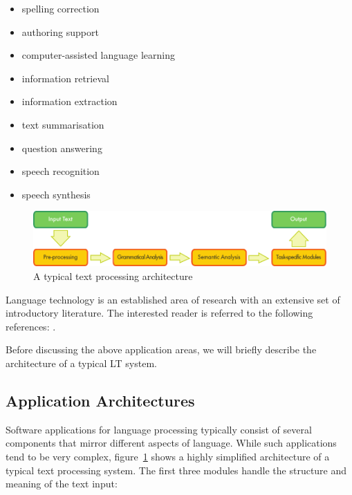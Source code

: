 \begin{multicols}{2}
\begin{itemize}
\item spelling correction
\item authoring support
\item computer-assisted language learning
\item information retrieval 
\item information extraction
\item text summarisation
\item question answering
\item speech recognition 
\item speech synthesis 
\end{itemize}

\begin{figure}[b]
  \center
  \includegraphics[width=\textwidth]{../_media/english/text_processing_app_architecture}
  \caption{A typical text processing architecture}
\label{fig:textprocessingarch_en}
\end{figure}

Language technology is an established area of research with an extensive set of introductory literature. The interested reader is referred to the following references: \cite{jurafsky-martin01, manning-schuetze1, lt-world1, lt-survey1}.

Before discussing the above application areas, we will briefly describe the architecture of a typical LT system.

\subsection{Application Architectures}

Software applications for language processing typically consist of several components that mirror different aspects of language. While such applications tend to be very complex, figure~\ref{fig:textprocessingarch_en} shows a highly simplified architecture of a typical text processing system. The first three modules handle the structure and meaning of the text input:


\end{multicols}
